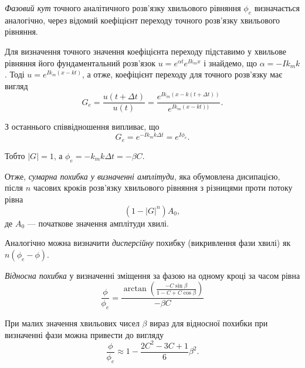 \begin{definition}
	\emph{Фазовий кут} точного аналітичного розв'язку хвильового рівняння $\phi_e$ визначається аналогічно, через відомий коефіцієнт переходу точного розв'язку хвильового рівняння.
\end{definition}

Для визначення точного значення коефіцієнта переходу підставимо у хвильове рівняння його фундаментальний розв'язок $u = e^{\alpha t}e^{Ik_mx}$ і знайдемо, що $\alpha=-Ik_mk$. Тоді $u=e^{Ik_m(x-kt)}$, а отже, коефіцієнт переходу для точного розв'язку має вигляд
\begin{equation*}
    G_e = \frac{u(t + \Delta t)}{u(t)} = \frac{e^{Ik_m(x-k(t+\Delta t))}}{e^{Ik_m(x-kt))}}.
\end{equation*}

З останнього співвідношення випливає, що
\begin{equation*}
    G_e = e^{-Ik_mk\Delta t}=e^{I\phi_e}.
\end{equation*}

Тобто $|G|=1$, а $\phi_e=-k_mk\Delta t=-\beta C$. 

\begin{proposition}
    Отже, \emph{сумарна похибка у визначенні амплітуди}, яка обумовлена дисипацією, після $n$ часових кроків розв'язку хвильового рівняння з різницями проти потоку рівна 
    \begin{equation*}
        (1 - |G|^n) A_0,
    \end{equation*}
    де $A_0$ --- початкове значення амплітуди хвилі. 
\end{proposition}

\begin{proposition}
    Аналогічно можна визначити \emph{дисперсійну} похибку (викривлення фази хвилі) як $n (\phi_e - \phi)$. 
\end{proposition}

\begin{proposition}
    \emph{Відносна похибка} у визначенні зміщення за фазою на одному кроці за часом рівна
    \begin{equation*}
        \frac{\phi}{\phi_e} = \frac{\arctan \left( \frac{-C\sin\beta}{1-C+C\cos\beta}\right)}{-\beta C}
    \end{equation*}
\end{proposition}
 
При малих значення хвильових чисел $\beta$ вираз для відносної похибки при визначенні фази можна привести до вигляду
\begin{equation*}
    \frac{\phi}{\phi_e} \approx 1 - \frac{2C^2-3C+1}{6} \beta^2.
\end{equation*}

